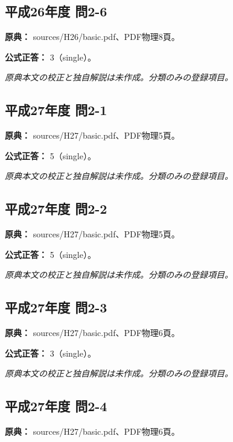 \subsection{平成26年度 問2-6}
\label{q:h26-reg-basic-2-6}

\noindent\textbf{原典：} sources/H26/basic.pdf、PDF物理8頁。

\textbf{公式正答：} 3（single）。

\par\textit{原典本文の校正と独自解説は未作成。分類のみの登録項目。}

\subsection{平成27年度 問2-1}
\label{q:h27-reg-basic-2-1}

\noindent\textbf{原典：} sources/H27/basic.pdf、PDF物理5頁。

\textbf{公式正答：} 5（single）。

\par\textit{原典本文の校正と独自解説は未作成。分類のみの登録項目。}

\subsection{平成27年度 問2-2}
\label{q:h27-reg-basic-2-2}

\noindent\textbf{原典：} sources/H27/basic.pdf、PDF物理5頁。

\textbf{公式正答：} 5（single）。

\par\textit{原典本文の校正と独自解説は未作成。分類のみの登録項目。}

\subsection{平成27年度 問2-3}
\label{q:h27-reg-basic-2-3}

\noindent\textbf{原典：} sources/H27/basic.pdf、PDF物理6頁。

\textbf{公式正答：} 3（single）。

\par\textit{原典本文の校正と独自解説は未作成。分類のみの登録項目。}

\subsection{平成27年度 問2-4}
\label{q:h27-reg-basic-2-4}

\noindent\textbf{原典：} sources/H27/basic.pdf、PDF物理6頁。

